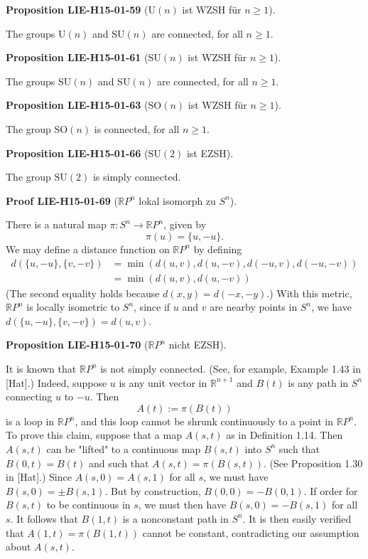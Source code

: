 \documentclass[10pt, letterpaper]{article}
\newcommand{\R}{\mathbb{R}}
\newcommand{\SO}{\mathrm{SO}}
\newcommand{\SU}{\mathrm{SU}}
\newcommand{\U}{\mathrm{U}}
\newcommand{\CustomHeading}[3]{%
  \par\medskip\noindent%
  \textbf{#1 #2} \textnormal{(#3)}.\enskip%
}
\newenvironment{PROP}[2]{\CustomHeading{Proposition}{#1}{#2}}{}
\newenvironment{PROOF}[2]{\CustomHeading{Proof}{#1}{#2}}{}
\begin{document}
\begin{PROP}{LIE-H15-01-59}{$\U(n)$ ist WZSH für $n\geq 1$}
The groups $\mathrm{U}(n)$ and $\mathrm{SU}(n)$ are connected, for all $n \geq 1$.
\end{PROP}

\begin{PROP}{LIE-H15-01-61}{$\SU(n)$ ist WZSH für $n\geq 1$}
The groups $\mathrm{SU}(n)$ and $\mathrm{SU}(n)$ are connected, for all $n \geq 1$.
\end{PROP}

\begin{PROP}{LIE-H15-01-63}{$\SO(n)$ ist WZSH für $n\geq 1$}
The group $\mathrm{SO}(n)$ is connected, for all $n \geq 1$.
\end{PROP}

\begin{PROP}{LIE-H15-01-66}{$\SU(2)$ ist EZSH}
The group $\mathrm{SU}(2)$ is simply connected.
\end{PROP}

\begin{PROOF}{LIE-H15-01-69}{$\R P^n$ lokal isomorph zu $S^n$}
There is a natural map $\pi: S^{n} \rightarrow \mathbb{R} P^{n}$, given by
$$
\pi(u)=\{u,-u\} .
$$
We may define a distance function on $\mathbb{R} P^{n}$ by defining
$$
\begin{aligned}
d(\{u,-u\},\{v,-v\}) & =\min (d(u, v), d(u,-v), d(-u, v), d(-u,-v)) \\
& =\min (d(u, v), d(u,-v))
\end{aligned}
$$
(The second equality holds because $d(x, y)=d(-x,-y)$.) With this metric, $\mathbb{R} P^{n}$ is locally isometric to $S^{n}$, since if $u$ and $v$ are nearby points in $S^{n}$, we have $d(\{u,-u\},\{v,-v\})=d(u, v)$.
\end{PROOF}

\begin{PROP}{LIE-H15-01-70}{$\R P^n$ nicht EZSH}
It is known that $\mathbb{R} P^{n}$ is not simply connected. (See, for example, Example 1.43 in [Hat].) Indeed, suppose $u$ is any unit vector in $\mathbb{R}^{n+1}$ and $B(t)$ is any path in $S^{n}$ connecting $u$ to $-u$. Then
$$
A(t):=\pi(B(t))
$$
is a loop in $\mathbb{R} P^{n}$, and this loop cannot be shrunk continuously to a point in $\mathbb{R} P^{n}$. To prove this claim, suppose that a map $A(s, t)$ as in Definition 1.14. Then $A(s, t)$ can be "lifted" to a continuous map $B(s, t)$ into $S^{n}$ such that $B(0, t)=B(t)$ and such that $A(s, t)=\pi(B(s, t))$. (See Proposition 1.30 in [Hat].) Since $A(s, 0)= A(s, 1)$ for all $s$, we must have $B(s, 0)= \pm B(s, 1)$. But by construction, $B(0,0)= -B(0,1)$. If order for $B(s, t)$ to be continuous in $s$, we must then have $B(s, 0)= -B(s, 1)$ for all $s$. It follows that $B(1, t)$ is a nonconstant path in $S^{n}$. It is then easily verified that $A(1, t)=\pi(B(1, t))$ cannot be constant, contradicting our assumption about $A(s, t)$.
\end{PROP}
\end{document}
